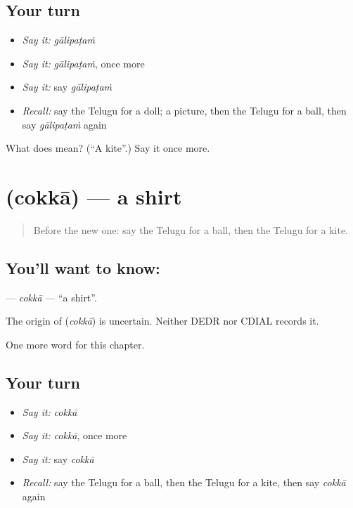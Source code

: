 \subsection*{Your turn}
\begin{itemize}
\raggedright
  \item \emph{Say it:} \emph{gālipaṭaṁ}
  \item \emph{Say it:} \emph{gālipaṭaṁ}, once more
  \item \emph{Say it:} say \emph{gālipaṭaṁ}
  \item \emph{Recall:} say the Telugu for a doll; a picture, then the Telugu for a ball, then say \emph{gālipaṭaṁ} again
\end{itemize}

\begin{tcolorbox}[breakable,colback=teal!4,colframe=teal!35!black,title={Before you move on}]
What does  mean? (\textquotedblleft{}A kite\textquotedblright{}.) Say it once more.
\end{tcolorbox}
\section[\texorpdfstring{\te{చొక్కా} (cokkā)}{చొక్కా (cokkā)}]{ (cokkā) — a shirt}

\label{lesson:TE-C114-cokka}



\begin{quote}
Before the new one: say the Telugu for a ball, then the Telugu for a kite.
\end{quote}

\subsection*{You'll want to know: }
\textbf{} — \emph{cokkā} — \textquotedblleft{}a shirt\textquotedblright{}.

\begin{cousinweb}
The origin of \textbf{} (\emph{cokkā}) is uncertain. Neither DEDR nor CDIAL records it.
\end{cousinweb}

\begin{grammarlens}[title={What you've built}]
One more word for this chapter.
\end{grammarlens}

\subsection*{Your turn}
\begin{itemize}
\raggedright
  \item \emph{Say it:} \emph{cokkā}
  \item \emph{Say it:} \emph{cokkā}, once more
  \item \emph{Say it:} say \emph{cokkā}
  \item \emph{Recall:} say the Telugu for a ball, then the Telugu for a kite, then say \emph{cokkā} again
\end{itemize}

